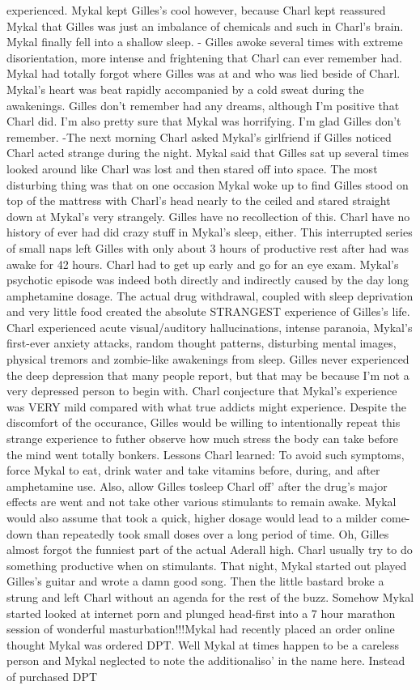 \documentclass[12pt]{book}
\begin{document}
experienced. Mykal kept Gilles's cool however, because Charl kept reassured Mykal that Gilles was just an imbalance of chemicals and such in Charl's brain. Mykal finally fell into a shallow sleep. - Gilles awoke several times with extreme disorientation, more intense and frightening that Charl can ever remember had. Mykal had totally forgot where Gilles was at and who was lied beside of Charl. Mykal's heart was beat rapidly accompanied by a cold sweat during the awakenings. Gilles don't remember had any dreams, although I'm positive that Charl did. I'm also pretty sure that Mykal was horrifying. I'm glad Gilles don't remember. -The next morning Charl asked Mykal's girlfriend if Gilles noticed Charl acted strange during the night. Mykal said that Gilles sat up several times looked around like Charl was lost and then stared off into space. The most disturbing thing was that on one occasion Mykal woke up to find Gilles stood on top of the mattress with Charl's head nearly to the ceiled and stared straight down at Mykal's very strangely. Gilles have no recollection of this. Charl have no history of ever had did crazy stuff in Mykal's sleep, either. This interrupted series of small naps left Gilles with only about 3 hours of productive rest after had was awake for 42 hours. Charl had to get up early and go for an eye exam. Mykal's psychotic episode was indeed both directly and indirectly caused by the day long amphetamine dosage. The actual drug withdrawal, coupled with sleep deprivation and very little food created the absolute STRANGEST experience of Gilles's life. Charl experienced acute visual/auditory hallucinations, intense paranoia, Mykal's first-ever anxiety attacks, random thought patterns, disturbing mental images, physical tremors and zombie-like awakenings from sleep. Gilles never experienced the deep depression that many people report, but that may be because I'm not a very depressed person to begin with. Charl conjecture that Mykal's experience was VERY mild compared with what true addicts might experience. Despite the discomfort of the occurance, Gilles would be willing to intentionally repeat this strange experience to futher observe how much stress the body can take before the mind went totally bonkers. Lessons Charl learned: To avoid such symptoms, force Mykal to eat, drink water and take vitamins before, during, and after amphetamine use. Also, allow Gilles tosleep Charl off' after the drug's major effects are went and not take other various stimulants to remain awake. Mykal would also assume that took a quick, higher dosage would lead to a milder come-down than repeatedly took small doses over a long period of time. Oh, Gilles almost forgot the funniest part of the actual Aderall high. Charl usually try to do something productive when on stimulants. That night, Mykal started out played Gilles's guitar and wrote a damn good song. Then the little bastard broke a strung and left Charl without an agenda for the rest of the buzz. Somehow Mykal started looked at internet porn and plunged head-first into a 7 hour marathon session of wonderful masturbation!!!Mykal had recently placed an order online thought Mykal was ordered DPT. Well Mykal at times happen to be a careless person and Mykal neglected to note the additionaliso' in the name here. Instead of purchased DPT 
\end{document}
